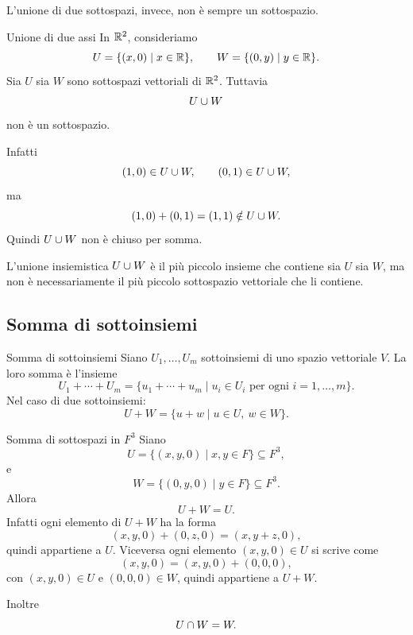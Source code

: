 \documentclass[a4paper]{article}
\begin{document}
L'unione di due sottospazi, invece, non è sempre un sottospazio.

\begin{snippetexample}{Unione di due assi}
    In \(\mathbb{R}^2\), consideriamo
    \[
        U=\{(x,0)\mid x\in\mathbb{R}\},
        \qquad
        W=\{(0,y)\mid y\in\mathbb{R}\}.
    \]
    Sia \(U\) sia \(W\) sono sottospazi vettoriali di \(\mathbb{R}^2\). Tuttavia
    \[
        U\cup W
    \]
    non è un sottospazio.

    Infatti
    \[
        (1,0)\in U\cup W,
        \qquad
        (0,1)\in U\cup W,
    \]
    ma
    \[
        (1,0)+(0,1)=(1,1)\notin U\cup W.
    \]
    Quindi \(U\cup W\) non è chiuso per somma.
    \begin{center}
    \end{center}
\end{snippetexample}

L'unione insiemistica \(U\cup W\) è il più piccolo insieme che contiene sia \(U\) sia \(W\), ma non è necessariamente il più piccolo sottospazio vettoriale che li contiene.

\subsection{Somma di sottoinsiemi}

\begin{snippetdefinition}{Somma di sottoinsiemi}
    Siano \(U_1,\ldots,U_m\) sottoinsiemi di uno spazio vettoriale \(V\). La loro somma è l'insieme
    \[
        U_1+\cdots+U_m
        =
        \{u_1+\cdots+u_m\mid u_i\in U_i \text{ per ogni } i=1,\ldots,m\}.
    \]
    Nel caso di due sottoinsiemi:
    \[
        U+W
        =
        \{u+w\mid u\in U,\ w\in W\}.
    \]
\end{snippetdefinition}

\begin{snippetexample}{Somma di sottospazi in \(F^3\)}
    Siano
    \[
        U=\{(x,y,0)\mid x,y\in F\}
        \subseteq F^3,
    \]
    e
    \[
        W=\{(0,y,0)\mid y\in F\}
        \subseteq F^3.
    \]
    Allora
    \[
        U+W=U.
    \]
    Infatti ogni elemento di \(U+W\) ha la forma
    \[
        (x,y,0)+(0,z,0)=(x,y+z,0),
    \]
    quindi appartiene a \(U\). Viceversa ogni elemento \((x,y,0)\in U\) si scrive come
    \[
        (x,y,0)=(x,y,0)+(0,0,0),
    \]
    con \((x,y,0)\in U\) e \((0,0,0)\in W\), quindi appartiene a \(U+W\).

    Inoltre
    \[
        U\cap W=W.
    \]
\end{snippetexample}
\end{document}
